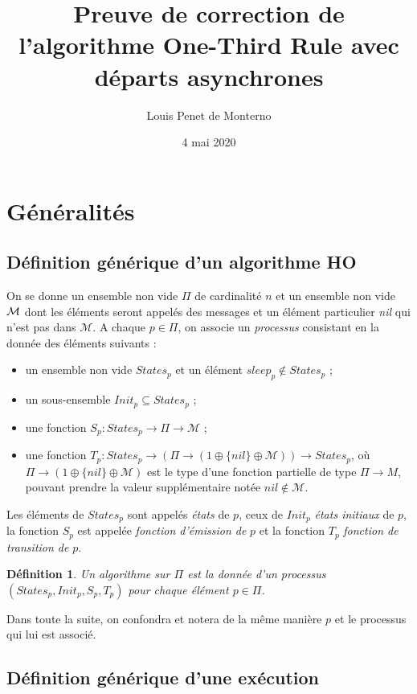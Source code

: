 \documentclass{article}
\title{Preuve de correction de l'algorithme One-Third Rule avec départs asynchrones}
\date{4 mai 2020}
\author{Louis Penet de Monterno}
\newtheorem{definition}{Définition}
\begin{document}
\maketitle
  
\section{Généralités}

\subsection{Définition générique d'un algorithme HO}

On se donne un ensemble non vide $\Pi$ de cardinalit\'e $n$ et  un ensemble non vide ${\cal M}$ dont les \'el\'ements seront appel\'es des
	messages et un \'el\'ement particulier {\em nil} qui n'est pas dans $\mathcal{M}$.
A chaque  $p \in \Pi$,  on associe  un {\em processus} consistant en la donn\'ee des \'el\'ements 
	suivants :
	\begin{itemize}
	\item un ensemble non vide $States_p$ et un  \'el\'ement $sleep_p \notin States_p$ ;
	\item un sous-ensemble   $Init_p \subseteq States_p$ ;
	\item une fonction $S_p : States_p \rightarrow \Pi \rightarrow \mathcal{M}$ ;
	\item une fonction 
	  $T_p : States_p \rightarrow (\Pi \rightarrow (1 \oplus \{ nil \} \oplus \mathcal{M}))
	  \rightarrow States_p$,
	  où $\Pi \rightarrow (1 \oplus \{ nil \} \oplus \mathcal{M})$ est le type d'une fonction partielle
		de type $\Pi \rightarrow M$, pouvant prendre la valeur supplémentaire notée $nil \notin \mathcal{M}$.
	\end{itemize}
Les \'el\'ements de 	$States_p$  sont appel\'es \emph{\'etats} de $p$, ceux de $Init_p$ \emph{\'etats initiaux} de $p$,
	la fonction $S_p$ est appel\'ee \emph{fonction d'émission de} $p$ et la fonction $T_p$ \emph{fonction de transition de} $p$.

\begin{definition}\label{def:algo}
Un algorithme  sur $\Pi$ est la donn\'ee d'un processus $(States_p, Init_p, S_p,T_p)$ pour chaque  \'el\'ement $p \in \Pi$.
\end{definition}
\noindent Dans toute la suite, on confondra et notera de la m\^eme mani\`ere $p$ et le processus qui lui est associ\'e.

\subsection{Définition générique d'une exécution}
\end{document}
